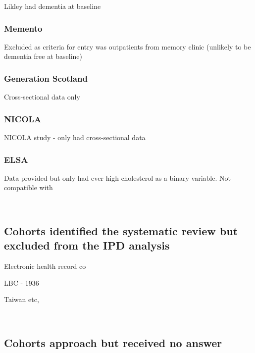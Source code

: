 \documentclass[a4paper, twoside]{templates/ociamthesis}
\begin{document}
Likley had dementia at baseline

\hypertarget{memento}{%
\subsubsection{Memento}\label{memento}}

Excluded as criteria for entry was outpatients from memory clinic (unlikely to be dementia free at baseline)

\hypertarget{generation-scotland-1}{%
\subsubsection{Generation Scotland}\label{generation-scotland-1}}

Cross-sectional data only

\hypertarget{nicola-1}{%
\subsubsection{NICOLA}\label{nicola-1}}

NICOLA study - only had cross-sectional data

\hypertarget{elsa}{%
\subsubsection{ELSA}\label{elsa}}

Data provided but only had ever high cholesterol as a binary variable. Not compatible with

~

\hypertarget{cohorts-identified-the-systematic-review-but-excluded-from-the-ipd-analysis}{%
\subsection{Cohorts identified the systematic review but excluded from the IPD analysis}\label{cohorts-identified-the-systematic-review-but-excluded-from-the-ipd-analysis}}

Electronic health record co

LBC - 1936

Taiwan etc,

~

\hypertarget{cohorts-approach-but-received-no-answer}{%
\subsection{Cohorts approach but received no answer}\label{cohorts-approach-but-received-no-answer}}
\end{document}
